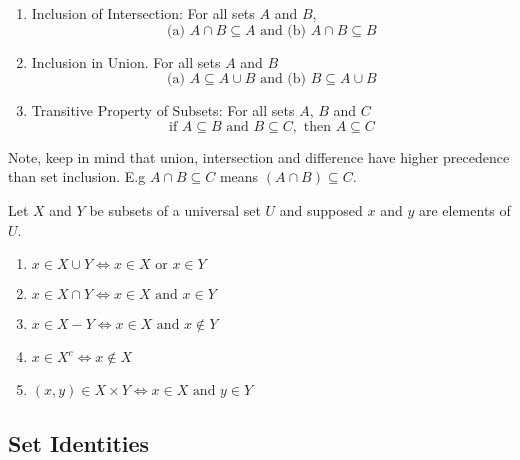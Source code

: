 \documentclass[11pt]{article}
\begin{document}
\begin{definition}\label{def:subset-relations}
    \begin{enumerate}
        \item Inclusion of Intersection: For all sets $A$ and $B$,
            \begin{equation*}
                \text{(a) } A \cap B \subseteq A \text{ and (b) } A \cap B \subseteq B
            \end{equation*}
        \item Inclusion in Union. For all sets $A$ and $B$
            \begin{equation*}
                \text{(a) } A \subseteq A \cup B \text{ and (b) } B \subseteq A \cup B
            \end{equation*}
        \item Transitive Property of Subsets: For all sets $A$, $B$ and $C$
            \begin{equation*}
                \text{if } A \subseteq B \text{ and } B \subseteq C, \text{ then } A \subseteq C
            \end{equation*}
    \end{enumerate}

    Note, keep in mind that union, intersection and difference have higher precedence
    than set inclusion. E.g $A \cap B \subseteq C$ means $(A \cap B) \subseteq C$.
\end{definition}

\begin{definition}\label{def:procedural-set-defs}
    Let $X$ and $Y$ be subsets of a universal set $U$ and supposed $x$ and $y$ are elements of $U$.
    \begin{enumerate}
        \item $x \in X \cup Y \iff x \in X \text{ or } x \in Y$
        \item $x \in X \cap Y \iff x \in X \text{ and } x \in Y$
        \item $x \in X - Y \iff x \in X \text{ and } x \notin Y$
        \item $x \in X^c \iff x \notin X$
        \item $(x,y) \in X \times Y \iff x \in X \text{ and } y \in Y$
    \end{enumerate}
\end{definition}

\newpage

\subsection{Set Identities}
\end{document}
